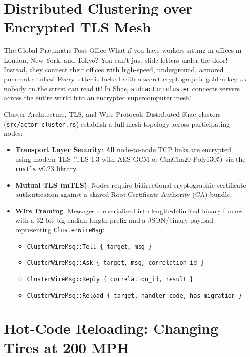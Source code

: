 \section{Distributed Clustering over Encrypted TLS Mesh}

\begin{kidbox}{The Global Pneumatic Post Office}
What if you have workers sitting in offices in London, New York, and Tokyo?
You can't just slide letters under the door!
Instead, they connect their offices with high-speed, underground, armored pneumatic tubes!
Every letter is locked with a secret cryptographic golden key so nobody on the street can read it!
In Shae, \texttt{std:actor:cluster} connects servers across the entire world into an encrypted supercomputer mesh!
\end{kidbox}

\begin{deepbox}{Cluster Architecture, TLS, and Wire Protocols}
Distributed Shae clusters (\texttt{src/actor\_cluster.rs}) establish a full-mesh topology across participating nodes:
\begin{itemize}
    \item \textbf{Transport Layer Security}: All node-to-node TCP links are encrypted using modern TLS (TLS 1.3 with AES-GCM or ChaCha20-Poly1305) via the \texttt{rustls} v0.23 library.
    \item \textbf{Mutual TLS (mTLS)}: Nodes require bidirectional cryptographic certificate authentication against a shared Root Certificate Authority (CA) bundle.
    \item \textbf{Wire Framing}: Messages are serialized into length-delimited binary frames with a 32-bit big-endian length prefix and a JSON/binary payload representing \texttt{ClusterWireMsg}:
    \begin{itemize}
        \item \texttt{ClusterWireMsg::Tell \{ target, msg \}}
        \item \texttt{ClusterWireMsg::Ask \{ target, msg, correlation\_id \}}
        \item \texttt{ClusterWireMsg::Reply \{ correlation\_id, result \}}
        \item \texttt{ClusterWireMsg::Reload \{ target, handler\_code, has\_migration \}}
    \end{itemize}
\end{itemize}
\end{deepbox}

\section{Hot-Code Reloading: Changing Tires at 200 MPH}


